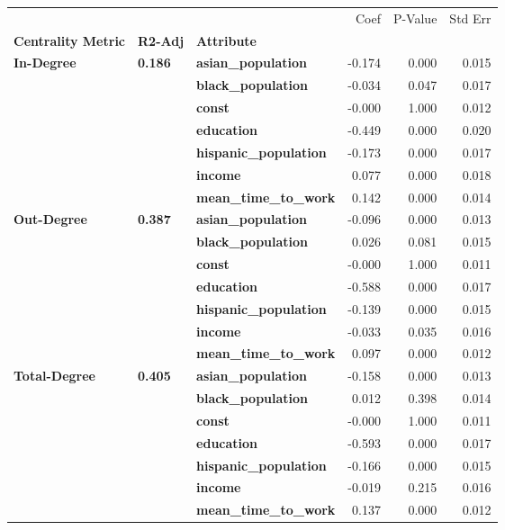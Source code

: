 \begin{tabular}{lllrrr}
\toprule
             &       &                   &   Coef &  P-Value &  Std Err \\
\textbf{Centrality Metric} & \textbf{R2-Adj} & \textbf{Attribute} &        &          &          \\
\midrule
\multirow{7}{*}{\textbf{In-Degree}} & \multirow{7}{*}{\textbf{0.186}} & \textbf{asian\_population} & -0.174 &    0.000 &    0.015 \\
             &       & \textbf{black\_population} & -0.034 &    0.047 &    0.017 \\
             &       & \textbf{const} & -0.000 &    1.000 &    0.012 \\
             &       & \textbf{education} & -0.449 &    0.000 &    0.020 \\
             &       & \textbf{hispanic\_population} & -0.173 &    0.000 &    0.017 \\
             &       & \textbf{income} &  0.077 &    0.000 &    0.018 \\
             &       & \textbf{mean\_time\_to\_work} &  0.142 &    0.000 &    0.014 \\
\cline{1-6}
\cline{2-6}
\multirow{7}{*}{\textbf{Out-Degree}} & \multirow{7}{*}{\textbf{0.387}} & \textbf{asian\_population} & -0.096 &    0.000 &    0.013 \\
             &       & \textbf{black\_population} &  0.026 &    0.081 &    0.015 \\
             &       & \textbf{const} & -0.000 &    1.000 &    0.011 \\
             &       & \textbf{education} & -0.588 &    0.000 &    0.017 \\
             &       & \textbf{hispanic\_population} & -0.139 &    0.000 &    0.015 \\
             &       & \textbf{income} & -0.033 &    0.035 &    0.016 \\
             &       & \textbf{mean\_time\_to\_work} &  0.097 &    0.000 &    0.012 \\
\cline{1-6}
\cline{2-6}
\multirow{7}{*}{\textbf{Total-Degree}} & \multirow{7}{*}{\textbf{0.405}} & \textbf{asian\_population} & -0.158 &    0.000 &    0.013 \\
             &       & \textbf{black\_population} &  0.012 &    0.398 &    0.014 \\
             &       & \textbf{const} & -0.000 &    1.000 &    0.011 \\
             &       & \textbf{education} & -0.593 &    0.000 &    0.017 \\
             &       & \textbf{hispanic\_population} & -0.166 &    0.000 &    0.015 \\
             &       & \textbf{income} & -0.019 &    0.215 &    0.016 \\
             &       & \textbf{mean\_time\_to\_work} &  0.137 &    0.000 &    0.012 \\
\bottomrule
\end{tabular}
